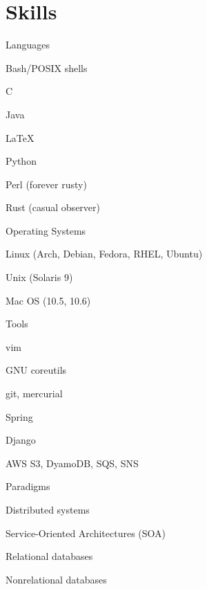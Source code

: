 \documentclass[10pt]{barag_resume}
\begin{document}
\section{Skills}\relax
    \vspace{-2em} %
    \begin{multicols}{2}
        \begin{csitemize}{Languages}
            \item Bash/POSIX shells
            \item C
            \item Java
            \item LaTeX
            \item Python
            \item Perl (forever rusty)
            \item Rust (casual observer)
        \end{csitemize}

        \begin{csitemize}{Operating Systems}
            \item Linux (Arch, Debian, Fedora, RHEL, Ubuntu)
            \item Unix (Solaris 9)
            \item Mac OS (10.5, 10.6)
        \end{csitemize}

        \begin{csitemize}{Tools}
            \item vim
            \item GNU coreutils
            \item git, mercurial
            \item Spring
            \item Django
            \item AWS S3, DyamoDB, SQS, SNS
        \end{csitemize}

        \begin{csitemize}{Paradigms}
            \item Distributed systems
            \item Service-Oriented Architectures (SOA)
            \item Relational databases
            \item Nonrelational databases
        \end{csitemize}
    \end{multicols}
\end{document}
